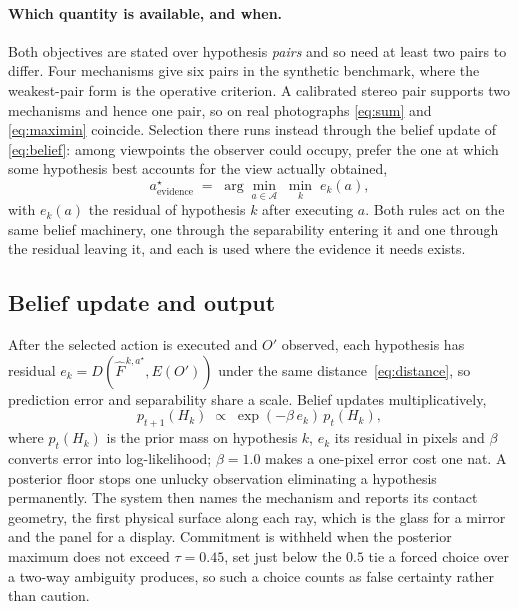 \paragraph{Which quantity is available, and when.}
Both objectives are stated over hypothesis \emph{pairs} and so need at least two
pairs to differ. Four mechanisms give six pairs in the synthetic benchmark, where
the weakest-pair form is the operative criterion. A calibrated stereo pair supports
two mechanisms and hence one pair, so on real photographs \eqref{eq:sum} and
\eqref{eq:maximin} coincide. Selection there runs instead through the belief update
of \eqref{eq:belief}: among viewpoints the observer could occupy, prefer the one at
which some hypothesis best accounts for the view actually obtained,
\begin{equation}
\label{eq:evidence-selection}
a^{\star}_{\text{evidence}} \;=\; \arg\min_{a \in \mathcal{A}} \;
\min_{k} \; e_k(a),
\end{equation}
with $e_k(a)$ the residual of hypothesis $k$ after executing $a$. Both rules act on
the same belief machinery, one through the separability entering it and one through
the residual leaving it, and each is used where the evidence it needs exists.

\subsection{Belief update and output}
\label{sec:belief}

After the selected action is executed and $O'$ observed, each hypothesis has
residual $e_k = D(\hat{F}^{\,k,a^\star}, E(O'))$ under the same
distance~\eqref{eq:distance}, so prediction error and separability share a scale.
Belief updates multiplicatively,
\begin{equation}
\label{eq:belief}
p_{t+1}(H_k) \;\propto\; \exp\!\left(-\beta\, e_k\right)\, p_t(H_k),
\end{equation}
where $p_t(H_k)$ is the prior mass on hypothesis $k$, $e_k$ its residual in pixels
and $\beta$ converts error into log-likelihood; $\beta = 1.0$ makes a one-pixel
error cost one nat. A posterior floor stops one unlucky observation eliminating a
hypothesis permanently. The system then names the mechanism and reports its contact
geometry, the first physical surface along each ray, which is the glass for a
mirror and the panel for a display. Commitment is withheld when the posterior
maximum does not exceed $\tau = 0.45$, set just below the $0.5$ tie a forced choice
over a two-way ambiguity produces, so such a choice counts as false certainty
rather than caution.

